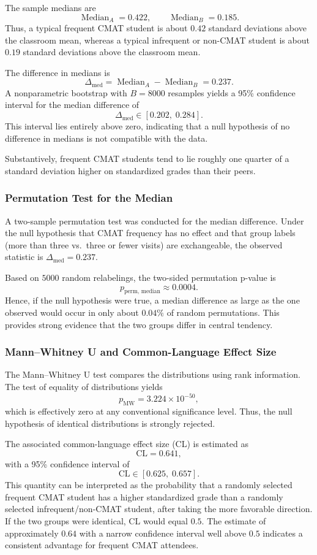\documentclass[8pt,a4paper]{article} %
\numberwithin{figure}{subsection}
\begin{document}
The sample medians are
\[
\operatorname{Median}_A = 0.422, \qquad
\operatorname{Median}_B = 0.185.
\]
Thus, a typical frequent CMAT student is about $0.42$ standard
deviations above the classroom mean, whereas a typical infrequent
or non-CMAT student is about $0.19$ standard deviations above the
classroom mean.

The difference in medians is
\[
\Delta_{\text{med}} = \operatorname{Median}_A - \operatorname{Median}_B
= 0.237.
\]
A nonparametric bootstrap with $B=8000$ resamples yields a 95\%
confidence interval for the median difference of
\[
\Delta_{\text{med}} \in [0.202,\; 0.284].
\]
This interval lies entirely above zero, indicating that a null
hypothesis of no difference in medians is not compatible with the
data.

Substantively, frequent CMAT students tend to lie roughly one
quarter of a standard deviation higher on standardized grades than
their peers.

\subsubsection{Permutation Test for the Median}

A two-sample permutation test was conducted for the median
difference. Under the null hypothesis that CMAT frequency has no
effect and that group labels (more than three vs.\ three or fewer
visits) are exchangeable, the observed statistic is
$\Delta_{\text{med}} = 0.237$.

Based on $5000$ random relabelings, the two-sided permutation
p-value is
\[
p_{\text{perm, median}} \approx 0.0004.
\]
Hence, if the null hypothesis were true, a median difference as
large as the one observed would occur in only about $0.04\%$ of
random permutations. This provides strong evidence that the two
groups differ in central tendency.

\subsubsection{Mann--Whitney U and Common-Language Effect Size}

The Mann--Whitney U test compares the distributions using rank
information. The test of equality of distributions yields
\[
p_{\text{MW}} = 3.224 \times 10^{-50},
\]
which is effectively zero at any conventional significance level.
Thus, the null hypothesis of identical distributions is strongly
rejected.

The associated common-language effect size (CL) is estimated as
\[
\text{CL} = 0.641,
\]
with a 95\% confidence interval of
\[
\text{CL} \in [0.625,\; 0.657].
\]
This quantity can be interpreted as the probability that a randomly
selected frequent CMAT student has a higher standardized grade than
a randomly selected infrequent/non-CMAT student, after taking the
more favorable direction. If the two groups were identical, CL
would equal $0.5$. The estimate of approximately $0.64$ with a
narrow confidence interval well above $0.5$ indicates a consistent
advantage for frequent CMAT attendees.
\end{document}
